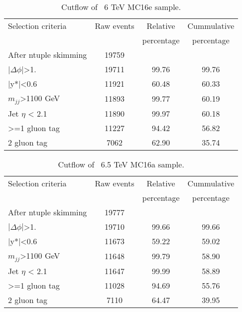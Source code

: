\begin{table}[ht]
\begin{center}
\begin{tabular}{|l|c|c|c|}
\hline
Selection criteria & Raw events &  Relative & Cummulative \\
 & & percentage & percentage \\
\hline
After ntuple skimming & 19759 &  &  \\
$|\Delta\phi|$>1. & 19711 & 99.76 & 99.76 \\
|y*|<0.6 & 11921 & 60.48 & 60.33 \\
$m_{jj}$>1100 GeV & 11893 & 99.77 & 60.19 \\
Jet $\eta$ < 2.1 & 11890 & 99.97 & 60.18 \\
>=1 gluon tag & 11227 & 94.42 & 56.82 \\
2 gluon tag & 7062 & 62.90 & 35.74 \\
\hline
\end{tabular}
\end{center}
\caption{Cutflow of \Hprime\ 6 TeV MC16e sample.}
\end{table}

\begin{table}[ht]
\begin{center}
\begin{tabular}{|l|c|c|c|}
\hline
Selection criteria & Raw events &  Relative & Cummulative \\
 & & percentage & percentage \\
\hline
After ntuple skimming & 19777 &  &  \\
$|\Delta\phi|$>1. & 19710 & 99.66 & 99.66 \\
|y*|<0.6 & 11673 & 59.22 & 59.02 \\
$m_{jj}$>1100 GeV & 11648 & 99.79 & 58.90 \\
Jet $\eta$ < 2.1 & 11647 & 99.99 & 58.89 \\
>=1 gluon tag & 11028 & 94.69 & 55.76 \\
2 gluon tag & 7110 & 64.47 & 39.95 \\
\hline
\end{tabular}
\end{center}
\caption{Cutflow of \Hprime\ 6.5 TeV MC16a sample.}
\end{table}

